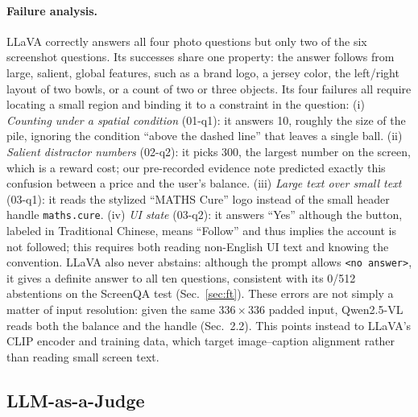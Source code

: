 \documentclass[10pt,twocolumn,letterpaper]{article}
\newcommand{\noans}{\texttt{\textless no answer\textgreater}}
\begin{document}
\paragraph{Failure analysis.} LLaVA correctly answers all four photo questions but only two of the six screenshot questions. Its successes share one property: the answer follows from large, salient, global features, such as a brand logo, a jersey color, the left/right layout of two bowls, or a count of two or three objects. Its four failures all require locating a small region and binding it to a constraint in the question:
(i) \emph{Counting under a spatial condition} (01-q1): it answers 10, roughly the size of the pile, ignoring the condition ``above the dashed line'' that leaves a single ball.
(ii) \emph{Salient distractor numbers} (02-q2): it picks 300, the largest number on the screen, which is a reward cost; our pre-recorded evidence note predicted exactly this confusion between a price and the user's balance.
(iii) \emph{Large text over small text} (03-q1): it reads the stylized ``MATHS Cure'' logo instead of the small header handle \texttt{maths.cure}.
(iv) \emph{UI state} (03-q2): it answers ``Yes'' although the button, labeled in Traditional Chinese, means ``Follow'' and thus implies the account is not followed; this requires both reading non-English UI text and knowing the convention.
LLaVA also never abstains: although the prompt allows \noans, it gives a definite answer to all ten questions, consistent with its 0/512 abstentions on the ScreenQA test (Sec.~\ref{sec:ft}). These errors are not simply a matter of input resolution: given the same $336\times336$ padded input, Qwen2.5-VL reads both the balance and the handle (Sec.~2.2). This points instead to LLaVA's CLIP encoder and training data, which target image--caption alignment rather than reading small screen text.


\subsection{LLM-as-a-Judge}
\label{sec:judge}
\end{document}
